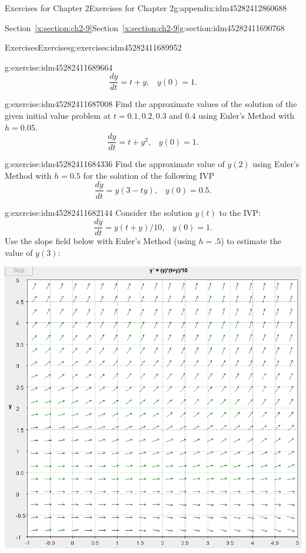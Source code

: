 \documentclass[oneside,10pt,]{book}
\numberwithin{equation}{section}
\numberwithin{equation}{section}
\begin{document}
\begin{appendixptx}{Exercises for Chapter 2}{}{Exercises for Chapter 2}{}{}{g:appendix:idm45282412860688}
\begin{sectionptx}{Section~\ref*{x:section:ch2-9}}{}{Section~\ref*{x:section:ch2-9}}{}{}{g:section:idm45282411690768}
\begin{exercises-subsection-numberless}{Exercises}{}{Exercises}{}{}{g:exercises:idm45282411689952}
\begin{divisionexercise}{1}{}{}{g:exercise:idm45282411689664}
\begin{equation*}
\frac{dy}{dt}=t+y,\,\,\,\,\,y(0)=1.
\end{equation*}
%
\end{divisionexercise}%
\begin{divisionexercise}{2}{}{}{g:exercise:idm45282411687008}%
Find the approximate values of the solution of the given initial value problem at \(t=0.1,0.2,0.3\) and \(0.4\) using Euler's Method with \(h=0.05\).%
\begin{equation*}
\frac{dy}{dt}=t+y^{2},\,\,\,\,\,y(0)=1.
\end{equation*}
%
\end{divisionexercise}%
\begin{divisionexercise}{3}{}{}{g:exercise:idm45282411684336}%
Find the approximate value of \(y\left(2\right)\) using Euler's Method with \(h=0.5\) for the solution of the following IVP%
\begin{equation*}
\frac{dy}{dt}=y\left(3-ty\right),\,\,\,\,\,y(0)=0.5.
\end{equation*}
%
\end{divisionexercise}%
\begin{divisionexercise}{4}{}{}{g:exercise:idm45282411682144}%
Consider the solution \(y(t)\) to the IVP:%
\begin{equation*}
\frac{dy}{dt}=y\left(t+y\right)/10,\,\,\,\,\,y(0)=1.
\end{equation*}
Use the slope field below with Euler's Method (using \(h=.5\)) to estimate the value of \(y(3)\): \begin{image}{0}{1}{0}%
\includegraphics[width=\linewidth]{images/2.9-4.png}

\end{image}
\end{divisionexercise}
\end{exercises-subsection-numberless}
\end{sectionptx}
\end{appendixptx}
\end{document}

